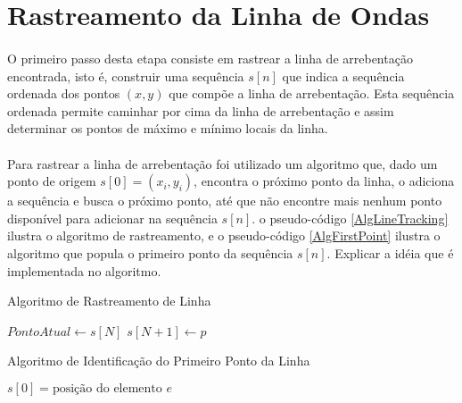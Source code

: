 \section{Rastreamento da Linha de Ondas}
\paragraph{}O primeiro passo desta etapa consiste em rastrear a linha de arrebentação encontrada, isto é, construir uma sequência \(s[n]\) que indica a sequência ordenada dos pontos \((x,y)\) que compõe a linha de arrebentação. Esta sequência ordenada permite caminhar por cima da linha de arrebentação e assim determinar os pontos de máximo e mínimo locais da linha.
\paragraph{}Para rastrear a linha de arrebentação foi utilizado um algoritmo que, dado um ponto de origem \(s[0] = (x_{i},y_{i})\), encontra o próximo ponto da linha, o adiciona a sequência e busca o próximo ponto, até que não encontre mais nenhum ponto disponível para adicionar na sequência \(s[n]\). o pseudo-código \ref{AlgLineTracking} ilustra o algoritmo de rastreamento, e o pseudo-código \ref{AlgFirstPoint} ilustra o algoritmo que popula o primeiro ponto da sequência $s[n]$. Explicar a idéia que é implementada no algoritmo.
\begin{algorithm}
\caption{Algoritmo de Rastreamento de Linha}
\label{AlgLineTracking}
\begin{algorithmic}
\State $PontoAtual \gets s[N]$ 
                \State $s[N+1] \gets p$
        \EndIf
\EndFor
{}
\Else
        \Else
        \EndIf
\EndIf
\EndProcedure
\end{algorithmic}
\end{algorithm}
\begin{algorithm}
\caption{Algoritmo de Identificação do Primeiro Ponto da Linha}
\label{AlgFirstPoint}
\begin{algorithmic}
                        \State $s[0] = \text{posição do elemento } e$
                \EndIf
        \EndFor
\EndFor
\EndProcedure
\end{algorithmic}
\end{algorithm}
